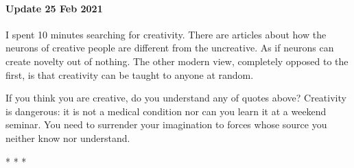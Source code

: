 \paragraph{Update 25 Feb 2021}

I spent 10 minutes searching for creativity. There are articles about how the neurons of creative people are different from the uncreative. As if neurons can create novelty out of nothing. The other modern view, completely opposed to the first, is that creativity can be taught to anyone at random.

If you think you are creative, do you understand any of quotes above? Creativity is dangerous: it is not a medical condition nor can you learn it at a weekend seminar. You need to surrender your imagination to forces whose source you neither know nor understand.



\begin{center}* * *\end{center}

